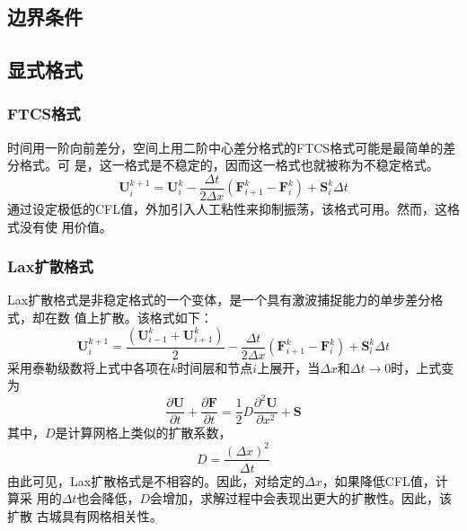 \subsection{边界条件}

\subsection{显式格式}

\subsubsection{FTCS格式}
时间用一阶向前差分，空间上用二阶中心差分格式的FTCS格式可能是最简单的差分格式。可
是，这一格式是不稳定的，因而这一格式也就被称为不稳定格式。
\begin{equation}
  \mathbf{U}_{i}^{k+1} 
  =
  \mathbf{U}_{i}^{k} -
  \frac{\Delta t}{2\Delta x}(\mathbf{F}_{i+1}^{k}-\mathbf{F}_{i}^{k}) + 
  \mathbf{S}_{i}^{k}\Delta t
\end{equation}
通过设定极低的CFL值，外加引入人工粘性来抑制振荡，该格式可用。然而，这格式没有使
用价值。

\subsubsection{Lax扩散格式}
Lax扩散格式是非稳定格式的一个变体，是一个具有激波捕捉能力的单步差分格式，却在数
值上扩散。该格式如下：
\begin{equation}
  \mathbf{U}_{i}^{k+1} 
  =
  \frac{(\mathbf{U}_{i-1}^{k} + \mathbf{U}_{i+1}^{k})}{2} -
  \frac{\Delta t}{2\Delta x}(\mathbf{F}_{i+1}^{k}-\mathbf{F}_{i}^{k}) + 
  \mathbf{S}_{i}^{k}\Delta t
\end{equation}
采用泰勒级数将上式中各项在$k$时间层和节点$i$上展开，当$\Delta x$和$\Delta
t\rightarrow 0$时，上式变为
\begin{equation}
  \frac{\partial \mathbf{U}}{\partial t} +
  \frac{\partial \mathbf{F}}{\partial t} =
  \frac{1}{2}D\frac{{\partial}^{2} \mathbf{U}}{\partial {x}^{2}} +
  \mathbf{S}
\end{equation}
其中，$D$是计算网格上类似的扩散系数，
\begin{equation}
D =
\frac{(\Delta x)^{2}}{\Delta t}
\end{equation}
由此可见，Lax扩散格式是不相容的。因此，对给定的$\Delta x$，如果降低CFL值，计算采
用的$\Delta t$也会降低，$D$会增加，求解过程中会表现出更大的扩散性。因此，该扩散
古城具有网格相关性。



